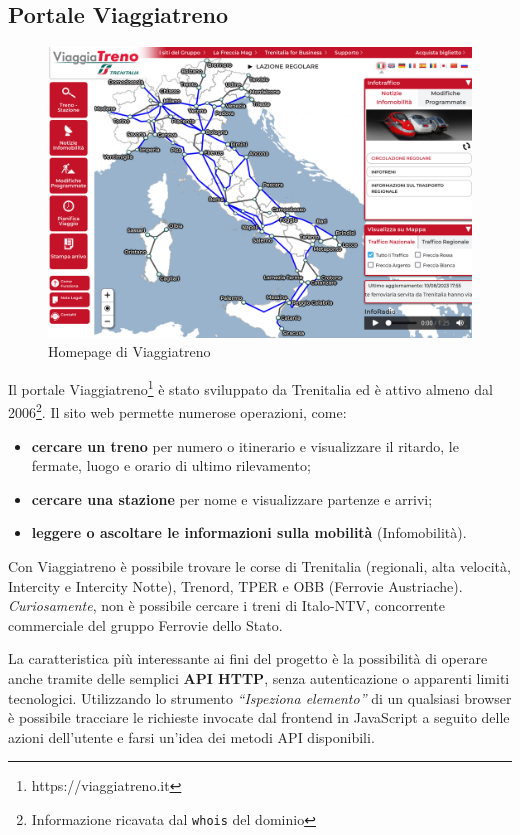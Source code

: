 \documentclass[12pt,italian]{report}
\begin{document}
\subsection{Portale Viaggiatreno}
\label{viaggiatreno}

\begin{figure}[h] \centering
    \includegraphics[width=1\textwidth]{images/viaggiatreno.png}
	\caption{Homepage di Viaggiatreno}
\end{figure}

Il portale Viaggiatreno\footnote{https://viaggiatreno.it} è stato
sviluppato da Trenitalia ed è attivo almeno dal
2006\footnote{Informazione ricavata dal \texttt{whois} del dominio}.
Il sito web permette numerose operazioni, come:
\begin{itemize}
	\item \textbf{cercare un treno} per numero o itinerario e
    visualizzare il ritardo, le fermate, luogo e orario di ultimo
    rilevamento;
	\item \textbf{cercare una stazione} per nome e visualizzare
    partenze e arrivi;
	\item \textbf{leggere o ascoltare le informazioni sulla mobilità}
    (Infomobilità).
\end{itemize}

Con Viaggiatreno è possibile trovare le corse di Trenitalia
(regionali, alta velocità, Intercity e Intercity Notte), Trenord, TPER
e OBB (Ferrovie Austriache).  \textit{Curiosamente}, non è possibile
cercare i treni di Italo-NTV, concorrente commerciale del gruppo
Ferrovie dello Stato.

La caratteristica più interessante ai fini del progetto è la
possibilità di operare anche tramite delle semplici \textbf{API HTTP},
senza autenticazione o apparenti limiti tecnologici.  Utilizzando lo
strumento \textit{``Ispeziona elemento''} di un qualsiasi browser è
possibile tracciare le richieste invocate dal frontend in JavaScript a
seguito delle azioni dell'utente e farsi un'idea dei metodi API
disponibili.
\end{document}
